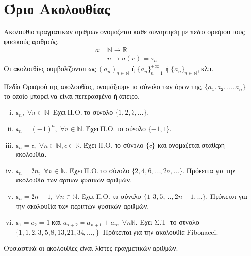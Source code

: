 \documentclass[main.tex]{subfiles}
\begin{document}
\section{Όριο Ακολουθίας}

\begin{dfn}
    Ακολουθία πραγματικών αριθμών ονομάζεται κάθε συνάρτηση με πεδίο ορισμού 
    τους φυσικούς αριθμούς. 
    \begin{align*}
        a \colon &\mathbb{N} \to \mathbb{R} \\
                 &n \to a(n)=a_{n}
     \end{align*} 
     Οι ακολουθίες συμβολίζονται ως $ (a_{n})_{n \in \mathbb{N}} $ ή 
     $ \{ a_{n} \} _{n=1}^{+\infty} $ ή $ \{ a_{n} \} _{n \in \mathbb{N}} 
     $, κλπ.
\end{dfn}

\begin{dfn}
    Πεδίο Ορισμού της ακολουθίας, ονομάζουμε το σύνολο των όρων της, 
    $ \{ a_{1}, a_{2}, \ldots, a_{n} \} $ το οποίο μπορεί να είναι 
    πεπερασμένο ή άπειρο.
\end{dfn}

\begin{examples}
        \item {}
    \begin{enumerate}[i)]
        \item $ a_{n}, \; \forall n \in \mathbb{N} $. Έχει Π.Ο. το σύνολο 
            $  \{ 1,2,3, \ldots \} $.
        \item $ a_{n} = (-1)^{n}, \; \forall n \in \mathbb{N} $. Έχει Π.Ο. 
            το σύνολο $ \{ -1,1 \} $.
        \item $ a_{n} = c, \; \forall n \in \mathbb{N}, c \in \mathbb{R} $.
            Έχει Π.Ο. το σύνολο $ \{ c \} $ και ονομάζεται σταθερή ακολουθία.
        \item $ a_{n}=2n, \; \forall n \in \mathbb{N} $. Έχει Π.Ο. το σύνολο 
            $ \{ 2,4,6, \ldots, 2n, \ldots \} $. Πρόκειτα για την ακολουθία 
            των άρτιων φυσικών αριθμών.
        \item $ a_{n}= 2n-1, \; \forall n \in \mathbb{N} $. Έχει Π.Ο. το 
            σύνολο $ \{ 1,3,5, \ldots, 2n+1, \ldots \} $. Πρόκεται για την 
            ακολουθία των περιττών φυσικών αριθμών.
        \item $ a_{1}= a_{2} = 1 $ και $ a_{n+2}=a_{n+1}+a_{n}, \; 
            \forall n \mathbb{N}$. Έχει Σ.Τ. το σύνολο $ \{ 1,1,2,3,5,8,
            13,21,34, \ldots,\} $. Πρόκειται για την ακολουθία Fibonacci. 
    \end{enumerate}
\end{examples}

\begin{rem}
    Ουσιαστικά οι ακολουθίες είναι λίστες πραγματικών αριθμών.
\end{rem}
\end{document}
